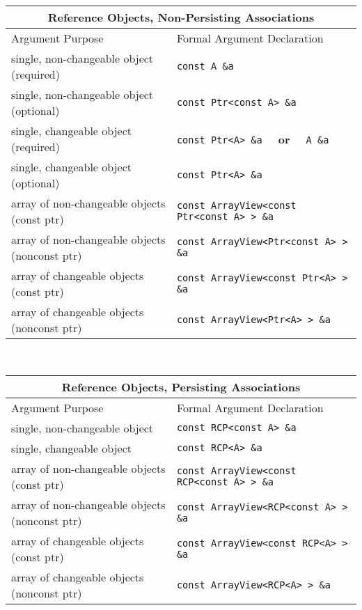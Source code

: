 %
\begin{tabular}{|l|l|}
%
\multicolumn{2}{c}{\textbf{Reference Objects, Non-Persisting Associations}} \\
%
\hline
Argument Purpose
& Formal Argument Declaration \\
\hline
\hline
single, non-changeable object (required)
& {}\texttt{const A \&a} \\
\hline
single, non-changeable object (optional)
& {}\texttt{const Ptr<const A> \&a} \\
\hline
single, changeable object (required)
& {}\texttt{const Ptr<A> \&a}  $\;\;\;\;$\textbf{or}$\;\;\;\;$ {}\texttt{A \&a} \\
\hline
single, changeable object (optional)
& \texttt{const Ptr<A> \&a} \\
\hline
array of non-changeable objects (const ptr)
& {}\texttt{const ArrayView<const Ptr<const A> > \&a} \\
\hline
array of non-changeable objects (nonconst ptr)
& {}\texttt{const ArrayView<Ptr<const A> > \&a} \\
\hline
array of changeable objects (const ptr)
& {}\texttt{const ArrayView<const Ptr<A> > \&a} \\
\hline
array of changeable objects (nonconst ptr)
& {}\texttt{const ArrayView<Ptr<A> > \&a} \\
\hline
\end{tabular} \\[3ex]
%
\begin{tabular}{|l|l|}
%
\multicolumn{2}{c}{\textbf{Reference Objects, Persisting Associations}} \\
%
\hline
Argument Purpose
& Formal Argument Declaration \\
\hline
\hline
single, non-changeable object
& {}\texttt{const RCP<const A> \&a} \\
\hline
single, changeable object
& {}\texttt{const RCP<A> \&a} \\
\hline
array of non-changeable objects (const ptr)
& {}\texttt{const ArrayView<const RCP<const A> > \&a} \\
\hline
array of non-changeable objects (nonconst ptr)
& {}\texttt{const ArrayView<RCP<const A> > \&a} \\
\hline
array of changeable objects (const ptr)
& {}\texttt{const ArrayView<const RCP<A> > \&a} \\
\hline
array of changeable objects (nonconst ptr)
& {}\texttt{const ArrayView<RCP<A> > \&a} \\
\hline
\end{tabular}
%

